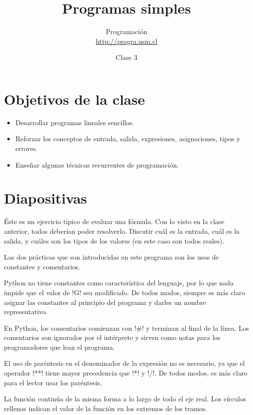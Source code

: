 \documentclass[10pt]{article}
\title{Programas simples}
\author{Programación \\ \url{http://progra.usm.cl}}
\date{Clase 3}
\begin{document}
  \maketitle

  \section*{Objetivos de la clase}
  \begin{itemize}
    \item Desarrollar programas lineales sencillos.
    \item Reforzar los conceptos de
      entrada, salida, expresiones, asignaciones, tipos y errores.
    \item Enseñar algunas técnicas recurrentes de programación.
  \end{itemize}

  \section*{Diapositivas}


  Éste es un ejercicio típico de evaluar una fórmula.
  Con lo visto en la clase anterior,
  todos deberían poder resolverlo.
  Discutir cuál es la entrada, cuál es la salida,
  y cuáles son los tipos de los valores
  (en este caso son todos reales).


  Las dos prácticas que son introducidas en este programa son
  los usos de constantes y comentarios.

  Python no tiene constantes como característica del lenguaje,
  por lo que nada impide que el valor de \li!G! sea modificado.
  De todos modos,
  siempre es más claro asignar las constantes al principio del programa
  y darles un nombre representativo.

  En Python,
  los comentarios comienzan con \li!#! y terminan al final de la línea.
  Los comentarios son ignorados por el intérprete
  y sirven como notas para los programadores que lean el programa.

  El uso de paréntesis en el denominador de la expresión
  no es necesario, ya que el operador \li!**! tiene mayor precedencia
  que \li!*! y \li!/!. De todos modos, es más claro para el lector
  usar los paréntesis.


  La función continúa de la misma forma a lo largo de todo el eje real.
  Los círculos rellenos indican el valor de la función en los extremos de los tramos.
\end{document}
